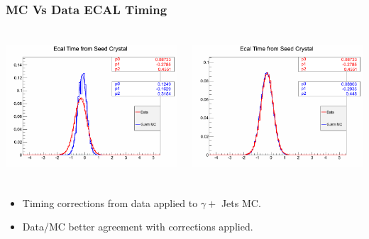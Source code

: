 \documentclass{beamer}
\begin{document}
\begin{frame}
\frametitle{MC Vs Data ECAL Timing}
  \begin{minipage}[t]{0.82\paperwidth}
    \begin{columns}
     \begin{column}{0.50\linewidth}
       \begin{tcolorbox}[colback=UNL@Cream!5,colframe=UNL@Cream!70,title=\textcolor{UMN@Maroon}{\textbf{Before Correction }}] 
          \includegraphics[height=5.0cm,width=\textwidth]            {THESISPLOTS/SeedTime_data-mc.png}
       \end{tcolorbox}
     \end{column}
     \begin{column}{0.50\linewidth}
       \begin{tcolorbox}[colback=UNL@Cream!5,colframe=UNL@Cream!70,title=\textcolor{UMN@Maroon}{\textbf{After Correction}}] 
             \includegraphics[height=5.0cm,width=\textwidth]            {THESISPLOTS/SeedTime_data-mc_Calib.png}
       \end{tcolorbox}
     \end{column}
  \end{columns}     
\end{minipage}
\begin{minipage}[b]{\linewidth}
    \begin{itemize}
     \item Timing corrections from data applied to $\gamma +$ Jets MC.
     \item Data/MC better agreement with corrections applied.
   \end{itemize}
  \end{minipage}
\end{frame}
\end{document}
